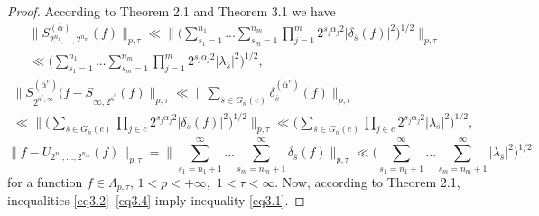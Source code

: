 \documentclass[12pt]{article}
\theoremstyle{plain}
\begin{document}
\begin{proof}
According to Theorem 2.1 \cite{2} and Theorem 3.1 we have
 \begin{multline}\label{eq3.2}
\|S_{2^{n_{1}},...,2^{n_{m}}}^{(\overline{\alpha})}(f)\|_{p, \tau}
\ll \Biggl\|\Biggl(\sum\limits_{s_{1}=1}^{n_{1}}...\sum\limits_{s_{m}=1}^{n_{m}}\prod_{j=1}^{m}2^{s_{j}\alpha_{j}2}|\delta_{\overline{s}}(f)|^{2}\Biggr)^{1/2} \Biggr\|_{p, \tau} 
\\
\ll 
\Biggl(\sum\limits_{s_{1}=1}^{n_{1}}...\sum\limits_{s_{m}=1}^{n_{m}}\prod_{j=1}^{m}2^{s_{j}\alpha_{j}2}|\lambda_{\overline{s}}|^{2}\Biggr)^{1/2},
\end{multline} 
\begin{multline}\label{eq3.3} 
\|S_{2^{\overline{n}^{e}, \infty}}^{(\overline{\alpha}^{e})}(f-S_{\infty, 2^{\overline{n}^{\hat{e}}}}(f)\|_{p, \tau}
\ll \biggl\|\sum\limits_{\overline{s}\in G_{\overline{n}}(e)}\delta_{\overline{s}}^{(\overline{\alpha}^{e})}(f) \biggr\|_{p, \tau}
\\ 
 \ll  \biggl\|\biggl(\sum\limits_{\overline{s}\in G_{\overline{n}}(e)}\prod_{j\in e}2^{s_{j}\alpha_{j}2} |\delta_{\overline{s}}(f)|^{2}\biggr)^{1/2} \biggr\|_{p, \tau} \ll \biggl(\sum\limits_{\overline{s}\in G_{\overline{n}}(e)}\prod_{j\in e}2^{s_{j}\alpha_{j}2} |\lambda_{\overline{s}}|^{2}\biggr)^{1/2}, 
\end{multline}
\begin{equation}\label{eq3.4} 
\|f-U_{2^{n_{1}},...,2^{n_{m}}} (f)\|_{p, \tau} =\biggl\|\sum\limits_{s_{1}=n_{1}+1}^{\infty}...\sum\limits_{s_{m}=n_{m}+1}^{\infty} \delta_{\overline{s}}(f) \biggr\|_{p, \tau} \ll \biggl(\sum\limits_{s_{1}=n_{1}+1}^{\infty}...\sum\limits_{s_{m}=n_{m}+1}^{\infty}|\lambda_{\overline{s}}|^{2}  \biggr)^{1/2}
\end{equation}
for a function   $f \in \Lambda_{p ,\tau}$, $1 < p < +\infty,$ $1< \tau< \infty$.
 Now, according to Theorem 2.1, inequalities \eqref{eq3.2}--\eqref{eq3.4} imply inequality \eqref{eq3.1}.
 

\end{proof}
\end{document}
